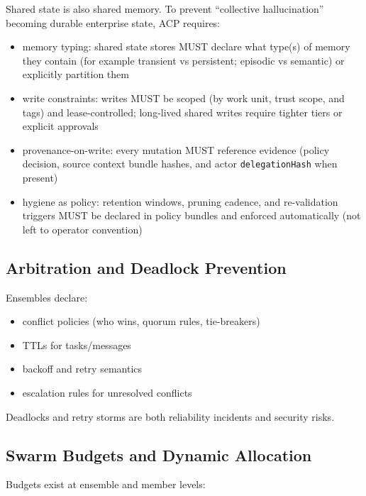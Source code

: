 \documentclass[11pt]{article}
\begin{document}
Shared state is also shared memory. To prevent ``collective
hallucination'' becoming durable enterprise state, ACP requires:

\begin{itemize}
\tightlist
\item
  memory typing: shared state stores MUST declare what type(s) of memory
  they contain (for example transient vs persistent; episodic vs
  semantic) or explicitly partition them
\item
  write constraints: writes MUST be scoped (by work unit, trust scope,
  and tags) and lease-controlled; long-lived shared writes require
  tighter tiers or explicit approvals
\item
  provenance-on-write: every mutation MUST reference evidence (policy
  decision, source context bundle hashes, and actor
  \texttt{delegationHash} when present)
\item
  hygiene as policy: retention windows, pruning cadence, and
  re-validation triggers MUST be declared in policy bundles and enforced
  automatically (not left to operator convention)
\end{itemize}

\hypertarget{arbitration-and-deadlock-prevention}{%
\subsection{Arbitration and Deadlock Prevention}\label{arbitration-and-deadlock-prevention}}

Ensembles declare:

\begin{itemize}
\tightlist
\item
  conflict policies (who wins, quorum rules, tie-breakers)
\item
  TTLs for tasks/messages
\item
  backoff and retry semantics
\item
  escalation rules for unresolved conflicts
\end{itemize}

Deadlocks and retry storms are both reliability incidents and security
risks.

\hypertarget{swarm-budgets-and-dynamic-allocation}{%
\subsection{Swarm Budgets and Dynamic Allocation}\label{swarm-budgets-and-dynamic-allocation}}

Budgets exist at ensemble and member levels:
\end{document}
